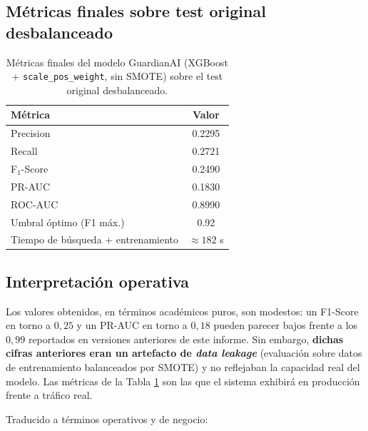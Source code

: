 \documentclass[12pt,a4paper]{report}
\begin{document}
\subsection*{Métricas finales sobre test original desbalanceado}

\begin{table}[H]
    \centering
    \caption{Métricas finales del modelo GuardianAI (XGBoost + \texttt{scale\_pos\_weight}, sin SMOTE) sobre el test original desbalanceado.}
    \label{tab:resultados_finales}
    \begin{tabular}{lc}
        \toprule
        \textbf{Métrica} & \textbf{Valor} \\
        \midrule
        Precision   & 0.2295 \\
        Recall      & 0.2721 \\
        F$_1$-Score & 0.2490 \\
        PR-AUC      & 0.1830 \\
        ROC-AUC     & 0.8990 \\
        Umbral óptimo (F1 máx.) & 0.92 \\
        Tiempo de búsqueda + entrenamiento & $\approx 182$ s \\
        \bottomrule
    \end{tabular}
\end{table}

\subsection*{Interpretación operativa}

Los valores obtenidos, en términos académicos puros, son modestos: un F1-Score en torno a $0{,}25$ y un PR-AUC en torno a $0{,}18$ pueden parecer bajos frente a los $0{,}99$ reportados en versiones anteriores de este informe. Sin embargo, \textbf{dichas cifras anteriores eran un artefacto de \textit{data leakage}} (evaluación sobre datos de entrenamiento balanceados por SMOTE) y no reflejaban la capacidad real del modelo. Las métricas de la Tabla \ref{tab:resultados_finales} son las que el sistema exhibirá en producción frente a tráfico real.

Traducido a términos operativos y de negocio:
\end{document}
